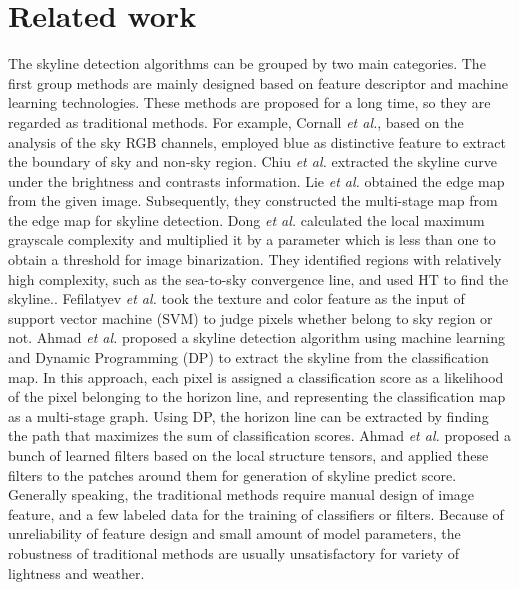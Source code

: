 \section{Related work}
\IEEEpubidadjcol
The skyline detection algorithms can be grouped by two main categories. The first group methods are mainly designed based on feature descriptor and machine learning technologies. These methods are proposed for a long time, so they are regarded as traditional methods. For example, Cornall \textit{et al.}\cite{iet:/content/journals/10.1049/el_20060547}, based on the analysis of the sky RGB channels, employed blue as distinctive feature to extract the boundary of sky and non-sky region. Chiu \textit{et al.} \cite{Chiu} extracted the skyline curve under the brightness and contrasts information. Lie \textit{et al.} \cite{LIE2005221} obtained the edge map from the given image. Subsequently, they constructed the multi-stage map from the edge map for skyline detection. Dong \textit{et al.} \cite{Dong2010} calculated the local maximum grayscale complexity and multiplied it by a parameter which is less than one to obtain a threshold for image binarization. They identified regions with relatively high complexity, such as the sea-to-sky convergence line, and used HT to find the skyline.. Fefilatyev \textit{et al.} \cite{Fefilatyev2006} took the texture and color feature as the input of support vector machine (SVM) to judge pixels whether belong to sky region or not. Ahmad \textit{et al.} \cite{Ahmad2015} proposed a skyline detection algorithm using machine learning and Dynamic Programming (DP) to extract the skyline from the classification map. In this approach, each pixel is assigned a classification score as a likelihood of the pixel belonging to the horizon line, and representing the classification map as a multi-stage graph. Using DP, the horizon line can be extracted by finding the path that maximizes the sum of classification scores. Ahmad \textit{et al.} \cite{Ahmad2021} proposed a bunch of learned filters based on the local structure tensors, and applied these filters to the patches around them for generation of skyline predict score. Generally speaking, the traditional methods require manual design of image feature, and a few labeled data for the training of classifiers or filters. Because of  unreliability of feature design and small amount of model parameters, the robustness of traditional methods are usually unsatisfactory for variety of lightness and weather. 
